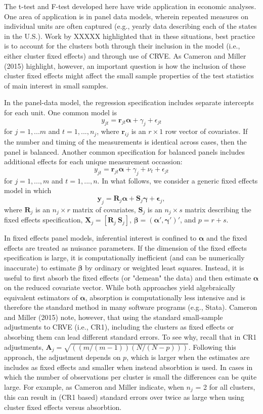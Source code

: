 \documentclass[12pt]{article}
\newcommand{\bm}{\mathbf}
\newcommand{\bs}{\boldsymbol}
\begin{document}
The t-test and F-test developed here have wide application in economic analyses. One area of application is in panel data models, wherein repeated measures on individual units are often captured (e.g., yearly data describing each of the states in the U.S.). Work by XXXXX highlighted that in these situations, best practice is to account for the clusters both through their inclusion in the model (i.e., either cluster fixed effects) and through use of CRVE. As Cameron and Miller (2015) highlight, however, an important question is how the inclusion of these cluster fixed effects might affect the small sample properties of the test statistics of main interest in small samples.

In the panel-data model, the regression specification includes separate intercepts for each unit. One common model is 
\[
y_{jt} = \bm{r}_{jt} \bs\alpha + \gamma_j + \epsilon_{jt} \]
for $j=1,...m$ and $t = 1,...,n_j$, where $\bm{r}_{ij}$ is an $r \times 1$ row vector of covariates. If the number and timing of the measurements is identical across cases, then the panel is balanced. Another common specification for balanced panels includes additional effects for each unique measurement occassion:
\[
y_{jt} = \bm{r}_{jt} \bs\alpha + \gamma_j + \nu_t + \epsilon_{jt} \]
for $j=1,...,m$ and $t = 1,...,n$. 
In what follows, we consider a generic fixed effects model in which
\begin{equation}
\label{eq:fixed_effects}
\bm{y}_j = \bm{R}_j \bs\alpha + \bm{S}_j \bs\gamma + \bs\epsilon_j,
\end{equation}
where $\bm{R}_j$ is an $n_j \times r$ matrix of covariates, $\bm{S}_j$ is an $n_j \times s$ matrix describing the fixed effects specification, $\bm{X}_j = \left[\bm{R}_j \ \bm{S}_j\right]$, $\bs\beta = \left(\bs\alpha', \bs\gamma'\right)'$, and $p = r + s$. 


In fixed effects panel models, inferential interest is confined to $\bs{\alpha}$ and the fixed effects are treated as nuisance parameters. If the dimension of the fixed effects specification is large, it is computationally inefficient (and can be numerically inaccurate) to estimate $\bs\beta$ by ordinary or weighted least squares. Instead, it is useful to first absorb the fixed effects (or "demean" the data) and then estimate $\bs\alpha$ on the reduced covariate vector.
While both approaches yield algebraically equivalent estimators of $\bs\alpha$, absorption is computationally less intensive and is therefore the standard method in many software programs (e.g., Stata). Cameron and Miller (2015) note, however, that using the standard small-sample adjustments to CRVE (i.e., CR1), including the clusters as fixed effects or absorbing them can lead different standard errors. To see why, recall that in CR1 adjustments, $\bm{A}_j = \sqrt{((m/(m-1))(N/(N-p)))}$. Following this approach, the adjustment depends on $p$, which is larger when the estimates are includes as fixed effects and smaller when instead absorbtion is used. In cases in which the number of observations per cluster is small the differences can be quite large. For example, as Cameron and Miller indicate, when $n_j$ = 2 for all clusters, this can result in (CR1 based) standard errors over twice as large when using cluster fixed effects versus absorbtion. 
\end{document}
